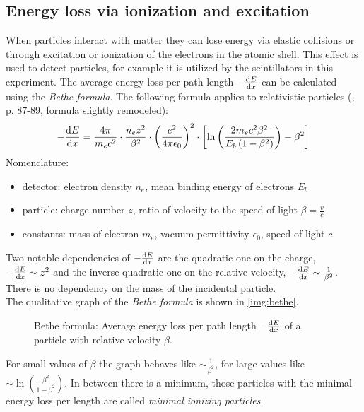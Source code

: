 \subsection{Energy loss via ionization and excitation}
When particles interact with matter they can lose energy via elastic collisions or through excitation or ionization of the electrons in the 
atomic shell. This effect is used to detect particles, for example it is utilized by the scintillators in this experiment. The average energy loss per path length 
$-\frac{\mathrm{d} E}{\mathrm{d} x}$ can be calculated using the \emph{Bethe formula}. The following formula applies to relativistic particles (\cite{dem4}, p. 87-89, formula slightly remodeled):
\begin{equation}
    - \frac{\mathrm{d} E}{\mathrm{d} x} = \frac{4 \pi}{m_e c^2} \cdot \frac{n_e z^2}{\beta^2} \cdot \left( \frac{e^2}{4 \pi \epsilon_0} \right)^2 \cdot \left[ \ln \left( \frac{2 m_e c^2 \beta^2}{E_b \left( 1-\beta^2 \right)  } \right) - \beta^2 \right]
\end{equation}
Nomenclature: 
\begin{itemize}
  \item detector: electron density $n_e$, mean binding energy of electrons $E_b$
  \item particle: charge number $z$, ratio of velocity to the speed of light $\beta = \frac{v}{c}$
  \item constants: mass of electron $m_e$, vacuum permittivity $\epsilon_0$, speed of light $c$
\end{itemize}
Two notable dependencies of $-\frac{\mathrm{d} E}{\mathrm{d} x}$ are the quadratic one on the charge, $-\frac{\mathrm{d} E}{\mathrm{d} x} \sim z^2$ and the inverse 
quadratic one on the relative velocity, $-\frac{\mathrm{d} E}{\mathrm{d} x} \sim \frac{1}{\beta^2}$. There is no dependency on the mass of the incidental 
particle.\\
The qualitative graph of the \emph{Bethe formula} is shown in \autoref{img:bethe}. 
\begin{figure}[H]
        \centering
        \def\svgwidth{0.55\textwidth}
       
        \caption{Bethe formula: Average energy loss per path length $-\frac{\mathrm{d} E}{\mathrm{d} x}$ of a particle with relative velocity $\beta$.}
        \label{img:bethe}
\end{figure}
For small values of $\beta$ the graph behaves like $\sim \frac{1}{\beta^2}$, for large values like 
$\sim \ln \left( \frac{\beta^2}{1-\beta^2} \right)$. In between there is a minimum, those particles with the minimal energy loss per length are called 
\emph{minimal ionizing particles}.

